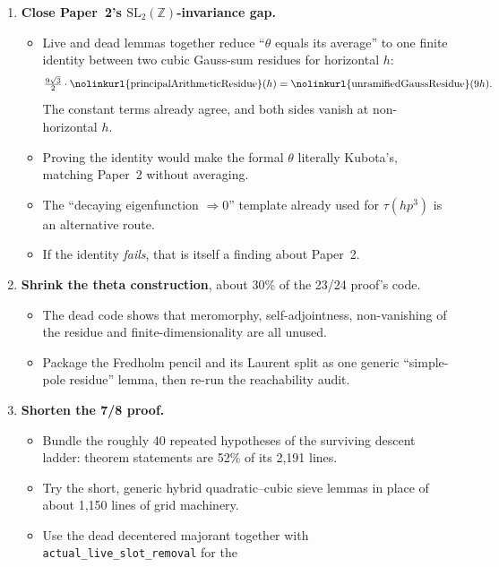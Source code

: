 \documentclass[11pt,a4paper]{article}
\newcommand{\lean}[1]{\nolinkurl{#1}}
\newcommand{\NK}{\mathrm N}
\begin{document}
\begin{enumerate}
\begin{itemize}
\item A Lean analogue of Paper~2's lemma removing excluded primes,
\[E_m\le\tau(m)\sum_{d\mid m}E(K,X/\NK d,F\NK d),\]
starting from the inclusion--exclusion identity
\lean{ideal_mobius_coprime_reindex}, would remove the mask.
\item That might shorten the descent. \emph{Unverified.}
\end{itemize}
\item \textbf{Close Paper~2's $\mathrm{SL}_2(\mathbb Z)$-invariance gap.}
\begin{itemize}
\item Live and dead lemmas together reduce ``$\theta$ equals its average'' to one finite identity
between two cubic Gauss-sum residues for horizontal $h$:
\[
\tfrac{9\sqrt3}{2}\cdot\text{\lean{principalArithmeticResidue}}(h)=\text{\lean{unramifiedGaussResidue}}(9h).
\]
The constant terms already agree, and both sides vanish at non-horizontal $h$.
\item Proving the identity would make the formal $\theta$ literally Kubota's, matching Paper~2
without averaging.
\item The ``decaying eigenfunction $\Rightarrow0$'' template already used for $\tau(hp^3)$ is an
alternative route.
\item If the identity \emph{fails}, that is itself a finding about Paper~2.
\end{itemize}
\item \textbf{Shrink the theta construction}, about 30\% of the 23/24 proof's code.
\begin{itemize}
\item The dead code shows that meromorphy, self-adjointness, non-vanishing of the residue and
finite-dimensionality are all unused.
\item Package the Fredholm pencil and its Laurent split as one generic ``simple-pole residue''
lemma, then re-run the reachability audit.
\end{itemize}
\item \textbf{Shorten the 7/8 proof.}
\begin{itemize}
\item Bundle the roughly 40 repeated hypotheses of the surviving descent ladder: theorem statements
are 52\% of its 2,191 lines.
\item Try the short, generic hybrid quadratic--cubic sieve lemmas in place of about 1,150 lines of
grid machinery.
\item Use the dead decentered majorant together with \lean{actual_live_slot_removal} for the

\end{itemize}
\end{enumerate}
\end{document}
